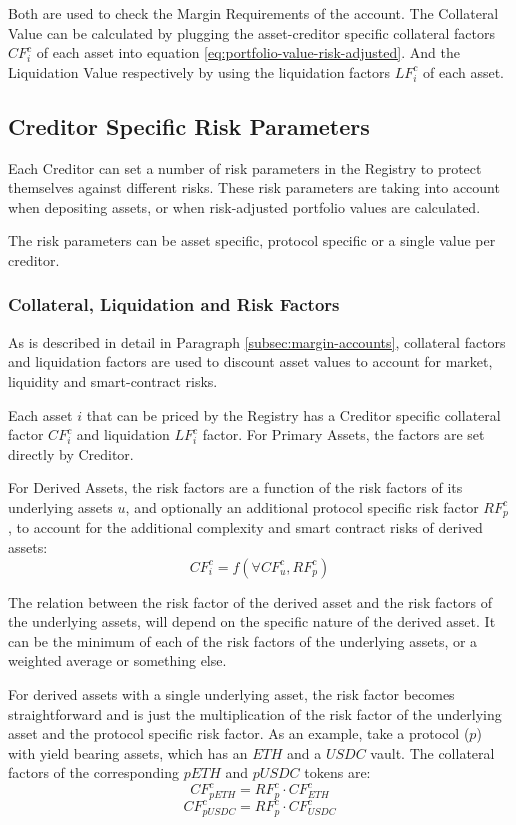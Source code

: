 \documentclass[sigconf,nonacm]{acmart}
\begin{document}
Both are used to check the Margin Requirements of the account.
The Collateral Value can be calculated by plugging the asset-creditor specific collateral factors $CF_{i}^{c}$ of each asset into equation \ref{eq:portfolio-value-risk-adjusted}.
And the Liquidation Value respectively by using the liquidation factors $LF_{i}^{c}$ of each asset.

\subsection{Creditor Specific Risk Parameters}
\label{subsec:creditor-specific-cisk-parameters}
Each Creditor can set a number of risk parameters in the Registry to protect themselves against different risks.
These risk parameters are taking into account when depositing assets, or when risk-adjusted portfolio values are calculated.

The risk parameters can be asset specific, protocol specific or a single value per creditor.

\subsubsection{Collateral, Liquidation and Risk Factors}
As is described in detail in Paragraph \ref{subsec:margin-accounts}, collateral factors and liquidation factors are used to discount asset values to account for market, liquidity and smart-contract risks.

Each asset $i$ that can be priced by the Registry has a Creditor specific collateral factor $CF_{i}^{c}$ and liquidation $LF_{i}^{c}$ factor.
For Primary Assets, the factors are set directly by Creditor.

For Derived Assets, the risk factors are a function of the risk factors of its underlying assets $u$, and optionally an additional protocol specific risk factor $RF_{p}^{c}$,
to account for the additional complexity and smart contract risks of derived assets:
\begin{equation}
    CF_{i}^{c} = f(\forall CF_{u}^{c}, RF_{p}^{c})
\end{equation}

The relation between the risk factor of the derived asset and the risk factors of the underlying assets,
will depend on the specific nature of the derived asset.
It can be the minimum of each of the risk factors of the underlying assets, or a weighted average or something else.

For derived assets with a single underlying asset,
the risk factor becomes straightforward and is just the multiplication of the risk factor of the underlying asset and the protocol specific risk factor.
As an example, take a protocol ($p$) with yield bearing assets, which has an $ETH$ and a $USDC$ vault.
The collateral factors of the corresponding $pETH$ and $pUSDC$ tokens are:
\begin{equation}
    CF_{pETH}^{c} = RF_{p}^{c} \cdot CF_{ETH}^{c}
\end{equation}
\begin{equation}
    CF_{pUSDC}^{c} = RF_{p}^{c} \cdot CF_{USDC}^{c}
\end{equation}
\end{document}
